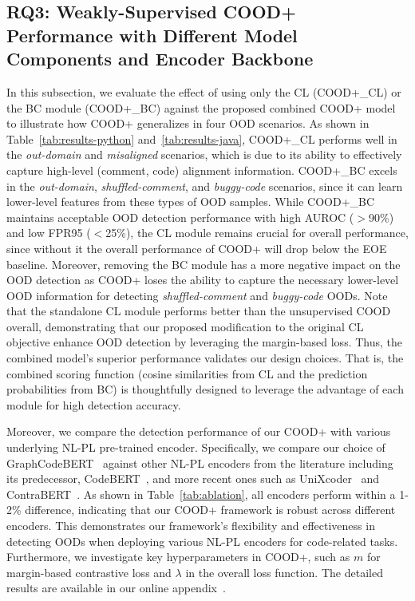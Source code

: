 \subsection{RQ3: Weakly-Supervised COOD+ Performance with Different Model Components and Encoder Backbone}
In this subsection, we evaluate the effect of using only the CL (COOD+\_CL) or the BC module (COOD+\_BC) against the proposed combined COOD+ model to illustrate how COOD+ generalizes in four OOD scenarios. As shown in Table~\ref{tab:results-python} and~\ref{tab:results-java}, COOD+\_CL performs well in the \textit{out-domain} and \textit{misaligned} scenarios, which is due to its ability to effectively capture high-level (comment, code) alignment information. COOD+\_BC excels in the \textit{out-domain}, \textit{shuffled-comment}, and \textit{buggy-code} scenarios, since it can learn lower-level features from these types of OOD samples. While COOD+\_BC maintains acceptable OOD detection performance with high AUROC ($>$90\%) and low FPR95 ($<$25\%), the CL module remains crucial for overall performance, since without it the overall performance of COOD+ will drop below the EOE baseline. Moreover, removing the BC module has a more negative impact on the OOD detection as COOD+ loses the ability to capture the necessary lower-level OOD information for detecting \textit{shuffled-comment} and \textit{buggy-code} OODs. Note that the standalone CL module performs better than the unsupervised COOD overall, demonstrating that our proposed modification to the original CL objective enhance OOD detection by leveraging the margin-based loss. Thus, the combined model's superior performance validates our design choices. That is, the combined scoring function (cosine similarities from CL and the prediction probabilities from BC) is thoughtfully designed to leverage the advantage of each module for high detection accuracy.



Moreover, we compare the detection performance of our COOD+ with various underlying NL-PL pre-trained encoder. Specifically, we compare our choice of GraphCodeBERT~\cite{guo2020graphcodebert} against other NL-PL encoders from the literature including its predecessor, CodeBERT~\cite{feng2020codebert}, and more recent ones such as UniXcoder~\cite{guo2022unixcoder} and ContraBERT~\cite{liu2023contrabert}. As shown in Table~\ref{tab:ablation}, all encoders perform within a 1-2\% difference, indicating that our COOD+ framework is robust across different encoders. This demonstrates our framework's flexibility and effectiveness in detecting OODs when deploying various NL-PL encoders for code-related tasks. Furthermore, we investigate key hyperparameters in COOD+, such as $m$ for margin-based contrastive loss and  $\lambda$ in the overall loss function. The detailed results are available in our online appendix~\cite{cood-tool}.


